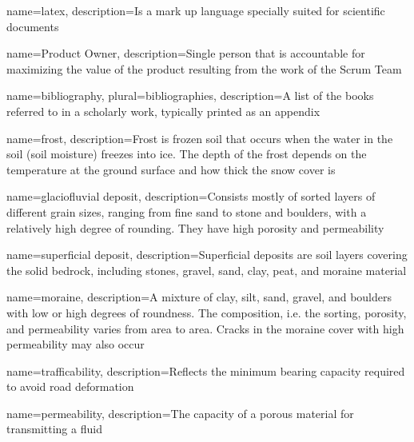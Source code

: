 

\makeglossaries %


{
        name=latex,
        description={Is a mark up language specially suited for
scientific documents}
}

{
        name=Product Owner,
        description={Single person that is accountable for maximizing the value of the product resulting from the work of the Scrum Team \cite{scrum_guide}}
}

{
        name=bibliography,
        plural=bibliographies,
        description={A list of the books referred to in a scholarly work, typically printed as an appendix}
}

{
    name=frost,
    description={Frost is frozen soil that occurs when the water in the soil (soil moisture) freezes into ice. The depth of the frost depends on the temperature at the ground surface and how thick the snow cover is \cite{senorge_terminology}}
}

{
    name=glaciofluvial deposit,
    description={Consists mostly of sorted layers of different grain sizes, ranging from fine sand to stone and boulders, with a relatively high degree of rounding. They have high porosity and permeability \cite{ngu_deposits}}
}

{
    name=superficial deposit,
    description={Superficial deposits are soil layers covering the solid bedrock, including stones, gravel, sand, clay, peat, and moraine material \cite{snl_losmasser}}
}

{
    name=moraine,
    description={A mixture of clay, silt, sand, gravel, and boulders with low or high degrees of roundness. The composition, i.e. the sorting, porosity, and permeability varies from area to area. Cracks in the moraine cover with high permeability may also occur \cite{ngu_deposits}}
}

{
    name=trafficability,
    description={Reflects the minimum bearing capacity required to avoid road deformation \cite{fjeld2023trafficability}}
}

{
    name=permeability,
    description={The capacity of a porous material for transmitting a fluid \cite{britannica_permeability}}
}

